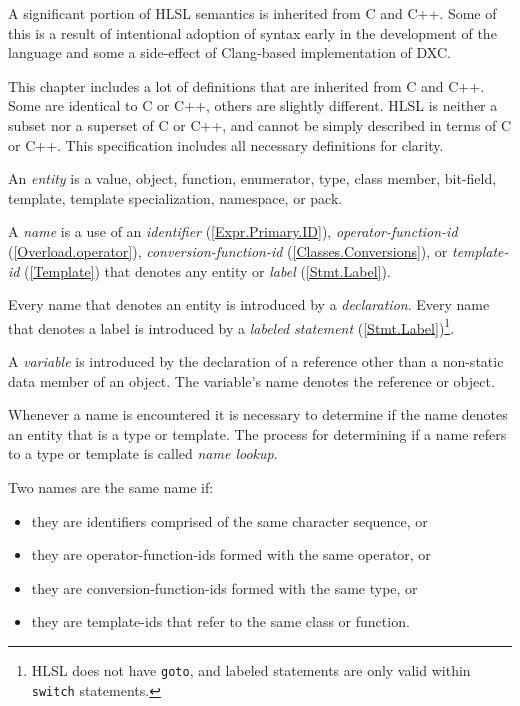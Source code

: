 
\begin{note}
  \p A significant portion of HLSL semantics is inherited from C and C++. Some
  of this is a result of intentional adoption of syntax early in the development
  of the language and some a side-effect of Clang-based implementation of DXC.

  \p This chapter includes a lot of definitions that are inherited from C and C++.
  Some are identical to C or C++, others are slightly different. HLSL is neither
  a subset nor a superset of C or C++, and cannot be simply described in terms
  of C or C++. This specification includes all necessary definitions for clarity.
\end{note}


\p An \textit{entity} is a value, object, function, enumerator, type, class
member, bit-field, template, template specialization, namespace, or pack.

\p A \textit{name} is a use of an \textit{identifier} (\ref{Expr.Primary.ID}),
\textit{operator-function-id} (\ref{Overload.operator}),
\textit{conversion-function-id} (\ref{Classes.Conversions}),
or \textit{template-id} (\ref{Template}) that denotes any entity or
\textit{label} (\ref{Stmt.Label}).

\p Every name that denotes an entity is introduced by a \textit{declaration}.
Every name that denotes a label is introduced by a \textit{labeled statement}
(\ref{Stmt.Label})\footnote{HLSL does not have \texttt{goto}, and labeled
statements are only valid within \texttt{switch} statements.}.

\p A \textit{variable} is introduced by the declaration of a reference other
than a non-static data member of an object. The variable's name denotes the
reference or object.

\p Whenever a name is encountered it is necessary to determine if the name
denotes an entity that is a type or template. The process for determining if a
name refers to a type or template is called \textit{name lookup}.

\p Two names are the same name if:
\begin{itemize}
\item they are identifiers comprised of the same character sequence, or
\item they are operator-function-ids formed with the same operator, or
\item they are conversion-function-ids formed with the same type, or
\item they are template-ids that refer to the same class or function.
\end{itemize}

